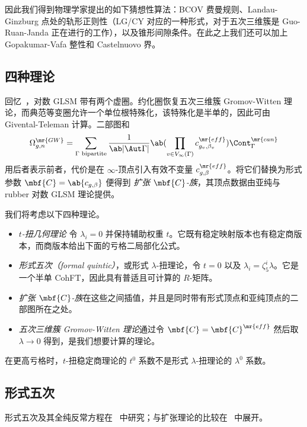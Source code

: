 因此我们得到物理学家提出的如下猜想性算法：BCOV 费曼规则、Landau-Ginzburg 点处的轨形正则性（LG/CY 对应的一种形式，对于五次三维簇是 Guo-Ruan-Janda 正在进行的工作），以及锥形间隙条件。在此之上我们还可以加上 Gopakumar-Vafa 整性和 Castelnuovo 界。

\subsection{四种理论}%
\label{sub:Four theories}

回忆~，对数 GLSM 带有两个虚圈。约化圈恢复五次三维簇 Gromov-Witten 理论，而典范等变圈允许一个单位根特殊化，该特殊化是半单的，因此可由 Givental-Teleman 计算。二部图和
\[ \Omega^{\mr{GW}}_{g,n} = \sum_{\Gamma \text{ bipartite}} \frac{1}{\ab|\Aut \Gamma|} \ab( \prod_{v \in V_{\infty}(\Gamma)} c^{\mr{eff}}_{g_v,\beta_v}) \Cont^{\mr{can}}_{\Gamma} \]
用后者表示前者，代价是在 \(\infty\)-顶点引入有效不变量 \(c^{\mr{eff}}_{g,\beta}\)。将它们替换为形式参数 \(\mbf{C} = \ab\{c_{g,\beta}\}\) 便得到 \textit{扩张 \(\mbf{C}\)-族}，其顶点数据由亚纯与 rubber 对数 GLSM 理论提供。

我们将考虑以下四种理论。
\begin{itemize}
    \item \textit{\(t\)-扭几何理论} 令 \(\lambda_i = 0\) 并保持辅助权重 \(t\)。它既有稳定映射版本也有稳定商版本，而商版本给出下面的亏格二局部化公式。
    \item \textit{形式五次（formal quintic）}，或形式 \(\lambda\)-扭理论，令 \(t = 0\) 以及 \(\lambda_i = \zeta_5^i \lambda\)。它是一个半单 CohFT，因此具有普适且可计算的 \(R\)-矩阵。
    \item \textit{扩张 \(\mbf{C}\)-族}在这些之间插值，并且是同时带有形式顶点和亚纯顶点的二部图所在之处。
    \item \textit{五次三维簇 Gromov-Witten 理论}通过令 \(\mbf{C} = \mbf{C}^{\mr{eff}}\) 然后取 \(\lambda \to 0\) 得到，是我们想要计算的理论。
\end{itemize}

\begin{warn}
    在更高亏格时，\(t\)-扭稳定商理论的 \(t^0\) 系数不是形式 \(\lambda\)-扭理论的 \(\lambda^0\) 系数。
\end{warn}

\subsection{形式五次}%
\label{sub:The formal quintic}

形式五次及其全纯反常方程在~\cite{LhoPandharipande2019} 中研究；与扩张理论的比较在~\cite{GJRstructure} 中展开。

